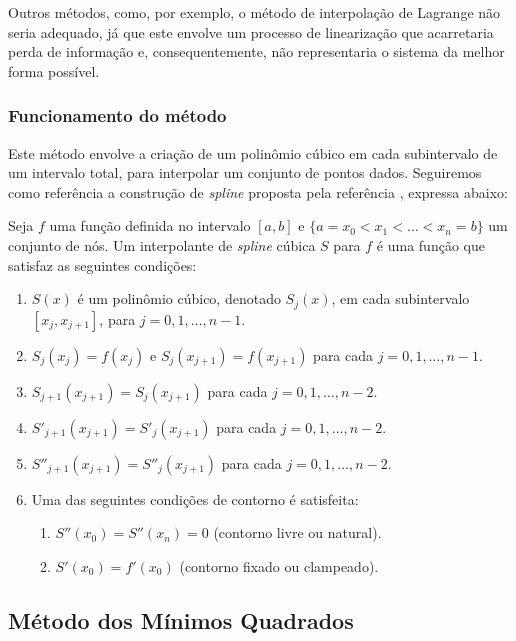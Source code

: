\documentclass[12pt, a4paper]{article}
\begin{document}
    Outros métodos, como, por exemplo, o método de interpolação de Lagrange
    não seria adequado, já que este envolve um processo de linearização que
    acarretaria perda de informação e, consequentemente, não representaria o
    sistema da melhor forma possível.
    
    \subsubsection{Funcionamento do método}
    Este método envolve a criação de um polinômio cúbico em cada subintervalo
    de um intervalo total, para interpolar um conjunto de pontos dados. Seguiremos
    como referência a construção de \textit{spline} proposta pela referência
    \cite{burden2016}, expressa abaixo:
    
    Seja $f$ uma função definida no intervalo $[a,b]$ e $ \{a = x_0 < x_1 <
        \ldots < x_n = b\}$ um conjunto de nós. Um interpolante de \textit{spline}
    cúbica $S$ para $f$ é uma função que satisfaz as seguintes condições:
    \begin{enumerate}
        \item $ S(x) $ é um polinômio cúbico, denotado $ S_j(x) $, em cada
              subintervalo $[x_j, x_{j+1}]$, para $ j = 0, 1, \ldots, n-1 $.
        \item $ S_j(x_j) = f(x_j) $ e $ S_j(x_{j+1}) = f(x_{j+1}) $ para cada $
                  j = 0, 1, \ldots, n-1 $.
        \item $ S_{j+1}(x_{j+1}) = S_j(x_{j+1}) $ para cada $ j = 0, 1, \ldots,
                  n-2 $.
        \item $ S'_{j+1}(x_{j+1}) = S'_j(x_{j+1}) $ para cada $ j = 0, 1,
                  \ldots, n-2 $.
        \item $ S''_{j+1}(x_{j+1}) = S''_j(x_{j+1}) $ para cada $ j = 0, 1,
                  \ldots, n-2 $.
        \item Uma das seguintes condições de contorno é satisfeita:
              \begin{enumerate}
                  \item $S''(x_0) = S''(x_n) = 0$ (contorno livre ou natural).
                  \item $S'(x_0) = f'(x_0)$ (contorno fixado ou clampeado).
              \end{enumerate}
    \end{enumerate}
    
    \subsection{Método dos Mínimos Quadrados}
\end{document}
